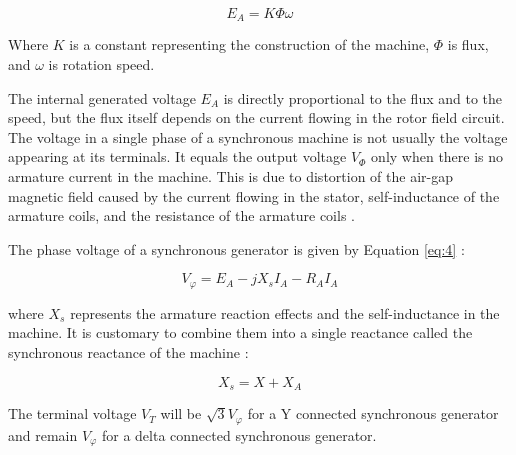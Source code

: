 \begin{equation}\label{eq:3}
E_{A} = K\Phi\omega
\end{equation}

Where \begin{math}K\end{math} is a constant representing the construction of the machine, \begin{math}\Phi\end{math} is flux, and \begin{math}\omega\end{math} is rotation speed.

The internal generated voltage \begin{math}E_A\end{math} is directly proportional to the flux and to the speed, but the flux itself depends on the current flowing in the rotor field circuit. The voltage in a single phase of a synchronous machine is not usually the voltage appearing at its terminals. It equals the output voltage \begin{math}V_\Phi\end{math} only when there is no armature current in the machine. This is due to distortion of the air-gap magnetic field caused by the current flowing in the stator, self-inductance of the armature coils, and the resistance of the armature coils \cite{machinery}.

The phase voltage of a synchronous generator is given by Equation \eqref{eq:4} \cite{machinery}:

\begin{equation}\label{eq:4}
V_\varphi = E_A - jX_s I_A - R_A I_A
\end{equation}

where \begin{math}X_s\end{math} represents the armature reaction effects and the self-inductance in the machine. It is customary to combine them into a single reactance called the synchronous reactance of the machine \cite{machinery}:

\begin{equation}\label{eq:5}
X_s = X + X_A
\end{equation}

The terminal voltage \begin{math}V_T\end{math} will be \begin{math}\sqrt{3} V_\varphi\end{math} for a Y connected synchronous generator and remain \begin{math}V_\varphi\end{math} for a delta connected synchronous generator.

